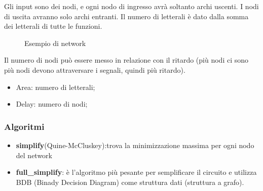 \documentclass[a4paper]{article}
\theoremstyle{break}
\theoremstyle{break}
\theoremstyle{break}
\theoremstyle{break}
\begin{document}
Gli input sono dei nodi, e ogni nodo di ingresso avrà soltanto archi uscenti. I nodi di uscita
avranno solo archi entranti. Il numero di letterali è dato dalla somma dei
letterali di tutte le funzioni.
\begin{figure}[H]
  \begin{center}
  \end{center}
  \caption{Esempio di network}
\end{figure}
Il numero di nodi può essere messo in relazione con il ritardo (più nodi ci sono più nodi devono
attraversare i segnali, quindi più ritardo).
\begin{itemize}
  \item Area: numero di letterali;
  \item Delay: numero di nodi;
\end{itemize}

\subsubsection{Algoritmi}
\begin{itemize}
  \item \textbf{simplify}(Quine-McCluskey):trova la minimizzazione massima per ogni nodo del network
  \item \textbf{full\_simplify}: è l'algoritmo più pesante per semplificare il circuito
    e utilizza BDB (Binady Decision Diagram) come struttura dati (struttura a grafo).
\end{itemize}
\end{document}
